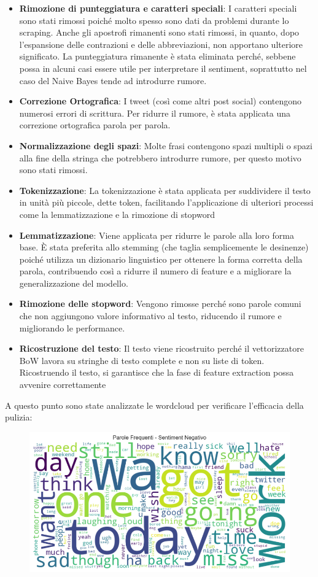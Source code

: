\documentclass[12pt,a4paper]{report} %
\begin{document}
\begin{itemize}
    \item \textbf{Rimozione di punteggiatura e caratteri speciali}: I caratteri speciali sono stati rimossi poiché molto spesso sono dati da problemi durante lo scraping. Anche gli apostrofi rimanenti sono stati rimossi, in quanto, dopo l’espansione delle contrazioni e delle abbreviazioni, non apportano ulteriore significato. La punteggiatura rimanente è stata eliminata perché, sebbene possa in alcuni casi essere utile per interpretare il sentiment, soprattutto nel caso del Naive Bayes tende ad introdurre rumore. 
    \item  \textbf{Correzione Ortografica}: I tweet (così come altri post social) contengono numerosi errori di scrittura. Per ridurre il rumore, è stata applicata una correzione ortografica parola per parola. 
    \item \textbf{Normalizzazione degli spazi}: Molte frasi contengono spazi multipli o spazi alla fine della stringa che potrebbero introdurre rumore, per questo motivo sono stati rimossi.
    \item \textbf{Tokenizzazione}: La tokenizzazione è stata applicata per suddividere il testo in unità più piccole, dette token, facilitando l’applicazione di ulteriori processi come la lemmatizzazione e la rimozione di stopword
    \item \textbf{Lemmatizzazione}: Viene applicata per ridurre le parole alla loro forma base. È stata preferita allo stemming (che taglia semplicemente le desinenze) poiché utilizza un dizionario linguistico per ottenere la forma corretta della parola, contribuendo così a ridurre il numero di feature e a migliorare la generalizzazione del modello. 
    \item \textbf{Rimozione delle stopword}: Vengono rimosse perché sono parole comuni che non aggiungono valore informativo al testo, riducendo il rumore e migliorando le performance. 
    \item \textbf{Ricostruzione del testo}: Il testo viene ricostruito perché il vettorizzatore BoW lavora su stringhe di testo complete e non su liste di token. Ricostruendo il testo, si garantisce che la fase di feature extraction possa avvenire correttamente 
\end{itemize}
A questo punto sono state analizzate le wordcloud per verificare l'efficacia della pulizia:
\begin{figure}[H]
    \centering
    \includegraphics[width=0.75\linewidth]{immagini/wordcloud_negativo_conwa.png}
\end{figure}
\end{document}
